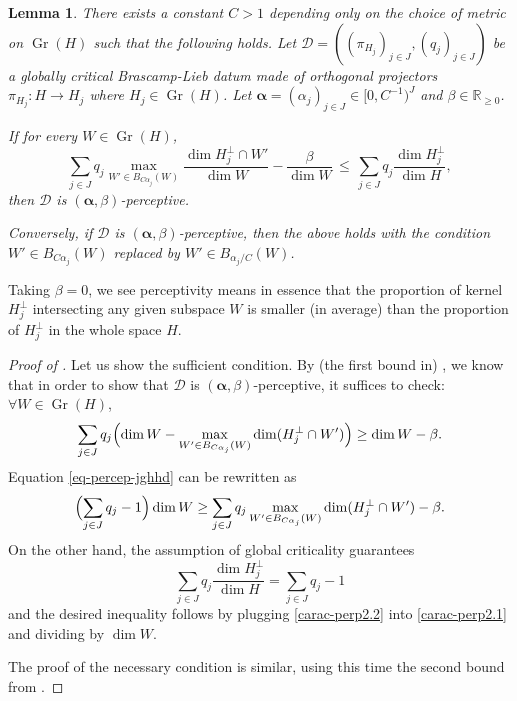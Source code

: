 \documentclass[a4paper,english]{amsart}
\newtheorem{lemma}[thm]{Lemma}
\theoremstyle{definition}
\newcommand{\R}{\mathbb{R}}
\newcommand{\bba}{\boldsymbol{\alpha}}
\newcommand{\1}{\mathbbm{1}}
\newcommand{\sD} {{\mathscr D}}
\DeclareMathOperator{\Gr}{Gr}
\begin{document}
\begin{lemma}
\label{percep-orthog-proj}
There exists a constant $C > 1$ depending only on the choice of  metric on $\Gr(H)$ such that the following holds.
Let $\sD=((\pi_{H_j})_{j\in J}, (q_{j})_{j\in J})$ be a globally critical Brascamp-Lieb datum made of orthogonal projectors $\pi_{H_j} : H \to H_j$ where $H_j \in \Gr(H)$.
Let $\bba = (\alpha_j)_{j \in J} \in [0, C^{-1})^J$ and $\beta \in \R_{\geq 0}$.

If for every $W \in \Gr(H)$,
\begin{equation*} %
\sum_{j \in J}  q_{j} \max_{W'\in B_{C\alpha_{j}}(W)} \frac{\dim H^{\perp}_{j} \cap W'}{\dim W} -\frac{\beta}{\dim W}\,\leq\, \sum_{j \in J}  q_{j} \frac{\dim H^{\perp}_{j}}{\dim H},
\end{equation*}
then $\sD$ is $(\bba,\beta)$-perceptive.

Conversely, if $\sD$ is $(\bba, \beta)$-perceptive, then the above holds with the condition $W'\in B_{C\alpha_{j}}(W)$ replaced by $W'\in B_{\alpha_{j}/C}(W)$.
\end{lemma}

Taking $\beta=0$, we see perceptivity means in essence that the proportion of kernel $H^\perp_{j}$ intersecting any given subspace $W$ is smaller (in average) than the proportion of $H^\perp_{j}$ in the whole space $H$.

\begin{proof}[Proof of ]
Let us show the sufficient condition.
By (the first bound in) , we know that in order to show that $\sD$ is $(\bba,\beta)$-perceptive, it suffices to check: $ \forall W \in \Gr(H)$,
\begin{equation}\label{eq-percep-jghhd}
  \sum_{j \in J} q_j \Bigl(\dim W - \max_{W'\in B_{C\alpha_{j}}(W)} \dim (H^\perp_{j} \cap W') \Bigr) \geq \dim W - \beta.
\end{equation}
Equation \eqref{eq-percep-jghhd} can be rewritten as
\begin{equation}\label{carac-perp2.1}
\Bigl(\sum_{j \in J}  q_{j} -1\Bigr)\dim W \geq \sum_{j \in J}  q_{j}\max_{W'\in B_{C\alpha_{j}}(W)}\dim(H^\perp_{j} \cap W') -\beta.
\end{equation}
On the other hand, the assumption of global criticality guarantees
\begin{equation}\label{carac-perp2.2}
\sum_{j \in J}  q_{j} \frac{\dim H^\perp_{j}}{\dim H} =\sum_{j \in J}  q_{j}-1
\end{equation}
and the desired inequality follows by plugging \eqref{carac-perp2.2} into \eqref{carac-perp2.1} and dividing by $\dim W$.

The proof of the necessary condition is similar, using this time the second bound from  .
\end{proof}
\end{document}
